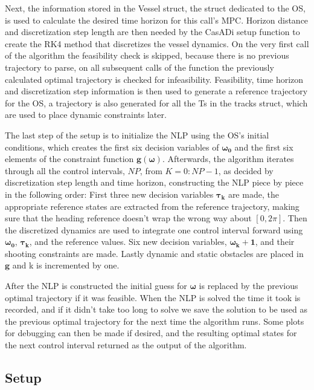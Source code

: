 Next, the information stored in the Vessel struct, the struct dedicated to the \gls{OS}, is used to calculate the desired time horizon for this call's
\gls{MPC}. Horizon distance and discretization step length are then needed by the CasADi setup function to create the \gls{RK4} method that
discretizes the vessel dynamics. On the very first call of the algorithm the feasibility check is skipped, because there is no previous trajectory to parse,
on all subsequent calls of the function the previously calculated optimal trajectory is checked for infeasibility. 
Feasibility, time horizon and discretization step information is then used to generate a reference trajectory for the \gls{OS}, a trajectory is
also generated for all the \gls{Ts} in the tracks struct, which are used to place dynamic constraints later.

The last step of the setup is to initialize the NLP using the \gls{OS}'s initial conditions, which creates the first
six decision variables of $\bm{\omega_0}$ and the first six elements of the constraint function $\textbf{g}(\bm{\omega})$.
Afterwards, the algorithm iterates through all the control intervals, $NP$, from $K = 0:NP-1$, as decided by discretization step length and time horizon, 
constructing the NLP piece by piece in the following order:\newline
First three new decision variables $\bm{\tau_k}$ are made, the appropriate reference states are extracted from the reference trajectory, making sure
that the heading reference doesn't wrap the wrong way about $[0, 2\pi]$. Then the discretized dynamics are used to integrate one control interval
forward using $\bm{\omega_0}$, $\bm{\tau_k}$, and the reference values. Six new decision variables, $\bm{\omega_k+1}$, and their shooting
constraints are made. Lastly dynamic and static obstacles are placed in $\textbf{g}$ and k is incremented by one.

After the \gls{NLP} is constructed the initial guess for $\bm{\omega}$ is replaced by the previous optimal trajectory if it was feasible.
When the \gls{NLP} is solved the time it took is recorded, and if it didn't take too long to solve we save the solution to be used as the previous
optimal trajectory for the next time the algorithm runs. Some plots for debugging can then be made if desired, and the resulting optimal states
for the next control interval returned as the output of the algorithm.


\subsection{Setup}

